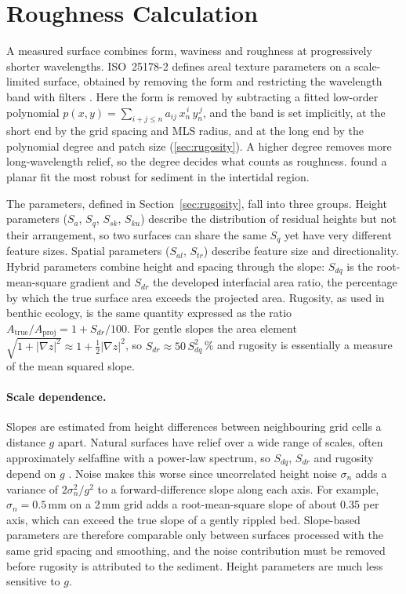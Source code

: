 \section{Roughness Calculation}
\label{sec:theory_roughness}
A measured surface combines form, waviness and roughness at progressively shorter wavelengths. ISO~25178-2 defines areal texture parameters on a scale-limited surface, obtained by removing the form and restricting the wavelength band with filters \cite{ISO2517822021, leachCharacterisationArealSurface2013}. Here the form is removed by subtracting a fitted low-order polynomial $p(x,y) = \sum_{i+j \le n} a_{ij}\, x_n^{\,i}\, y_n^{\,j}$, and the band is set implicitly, at the short end by the grid spacing and MLS radius, and at the long end by the polynomial degree and patch size (\autoref{sec:rugosity}). A higher degree removes more long-wavelength relief, so the degree decides what counts as roughness. \cite{azharRGBDFrameworkCapturing2022} found a planar fit the most robust for sediment in the intertidal region.

The parameters, defined in Section~\autoref{sec:rugosity}, fall into three groups. Height parameters ($S_a$, $S_q$, $S_{sk}$, $S_{ku}$) describe the distribution of residual heights but not their arrangement, so two surfaces can share the same $S_q$ yet have very different feature sizes. Spatial parameters ($S_{al}$, $S_{tr}$) describe feature size and directionality. Hybrid parameters combine height and spacing through the slope: $S_{dq}$ is the root-mean-square gradient and $S_{dr}$ the developed interfacial area ratio, the percentage by which the true surface area exceeds the projected area. Rugosity, as used in benthic ecology, is the same quantity expressed as the ratio $A_{\mathrm{true}}/A_{\mathrm{proj}}=1+S_{dr}/100$. For gentle slopes the area element $\sqrt{1+\lvert\nabla z\rvert^2}\approx1+\tfrac{1}{2}\lvert\nabla z\rvert^2$, so $S_{dr}\approx50\,S_{dq}^2$\,\% and rugosity is essentially a measure of the mean squared slope.

\paragraph{Scale dependence.} Slopes are estimated from height differences between neighbouring grid cells a distance $g$ apart. Natural surfaces have relief over a wide range of scales, often approximately \gls{selfaffine} with a power-law spectrum, so $S_{dq}$, $S_{dr}$ and rugosity depend on $g$ \cite{jacobsQuantitativeCharacterizationSurface2017}. Noise makes this worse since uncorrelated height noise $\sigma_n$ adds a variance of $2\sigma_n^2/g^2$ to a forward-difference slope along each axis. For example, $\sigma_n=0.5$\,mm on a 2\,mm grid adds a root-mean-square slope of about 0.35 per axis, which can exceed the true slope of a gently rippled bed. Slope-based parameters are therefore comparable only between surfaces processed with the same grid spacing and smoothing, and the noise contribution must be removed before rugosity is attributed to the sediment. Height parameters are much less sensitive to $g$.

